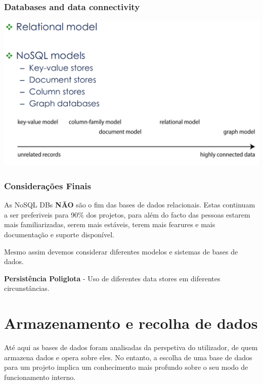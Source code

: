 \documentclass{article}
\begin{document}
\subsubsection{Databases and data connectivity}

\begin{center}
  \includegraphics[scale=0.25]{41}
\end{center}

\pagebreak

\subsubsection{Considerações Finais}

As NoSQL DBs \textbf{NÃO} são o fim das bases de dados relacionais.
Estas continuam a ser preferiveis para 90\% dos projetos, para além do facto
das pessoas estarem mais familiarizadas, serem mais estáveis, terem mais
fearures e mais documentação e suporte disponível.

Mesmo assim devemos considerar diferentes modelos e sistemas de bases de dados.

\vspace{2mm}

\begin{flushleft}
  \textbf{Persistência Poliglota} - Uso de diferentes data stores em diferentes circunstâncias.
\end{flushleft}

\section{Armazenamento e recolha de dados}

Até aqui as bases de dados foram analisadas da perspetiva do utilizador, de quem armazena
dados e opera sobre eles. No entanto, a escolha de uma base de dados para um projeto
implica um conhecimento mais profundo sobre o seu modo de funcionamento interno.
\end{document}
